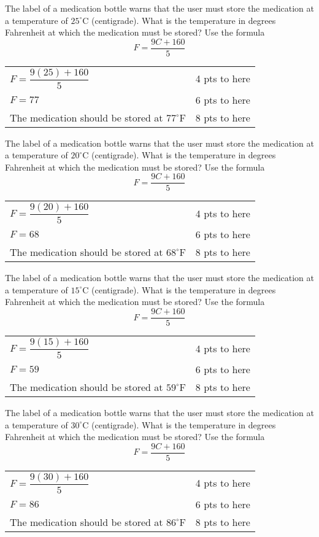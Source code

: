 {
	The label of a medication bottle warns that the user must store the medication at a temperature of $25^\circ$C (centigrade). What is the temperature in degrees Fahrenheit at which the medication must be stored? Use the formula $$F=\frac{9C+160}{5}$$
}
{
	\begin{tabular}{l r}
	$F=\dfrac{9(25)+160}{5}$ & 4 pts to here\\
	$F=77$ & 6 pts to here\\
	The medication should be stored at $77^\circ$F & 8 pts to here
	\end{tabular}
}

{
	The label of a medication bottle warns that the user must store the medication at a temperature of $20^\circ$C (centigrade). What is the temperature in degrees Fahrenheit at which the medication must be stored? Use the formula $$F=\frac{9C+160}{5}$$
}
{
	\begin{tabular}{l r}
	$F=\dfrac{9(20)+160}{5}$ & 4 pts to here\\
	$F=68$ & 6 pts to here\\
	The medication should be stored at $68^\circ$F & 8 pts to here
	\end{tabular}
}

{
	The label of a medication bottle warns that the user must store the medication at a temperature of $15^\circ$C (centigrade). What is the temperature in degrees Fahrenheit at which the medication must be stored? Use the formula $$F=\frac{9C+160}{5}$$
}
{
	\begin{tabular}{l r}
	$F=\dfrac{9(15)+160}{5}$ & 4 pts to here\\
	$F=59$ & 6 pts to here\\
	The medication should be stored at $59^\circ$F & 8 pts to here
	\end{tabular}
}

{
	The label of a medication bottle warns that the user must store the medication at a temperature of $30^\circ$C (centigrade). What is the temperature in degrees Fahrenheit at which the medication must be stored? Use the formula $$F=\frac{9C+160}{5}$$
}
{
	\begin{tabular}{l r}
	$F=\dfrac{9(30)+160}{5}$ & 4 pts to here\\
	$F=86$ & 6 pts to here\\
	The medication should be stored at $86^\circ$F & 8 pts to here
	\end{tabular}
}

